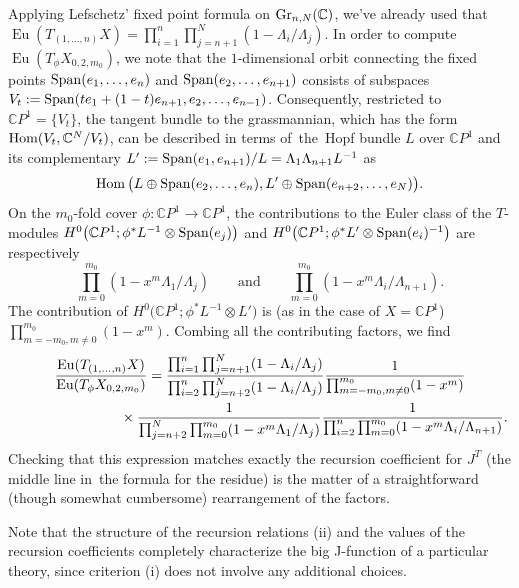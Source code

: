 \documentclass[10pt,a4paper]{amsart}
\numberwithin{equation}{section}
\def\CC{\mathbb C}
\def\Eu{\operatorname{Eu}}
\theoremstyle{definition}
\theoremstyle{plain}
\begin{document}
Applying Lefschetz' fixed point formula on ${\rm Gr}_{n,N}(\CC)$, we've already used that $\Eu(T_{(1,\dots,n)}X)\!=\prod_{i=1}^n\prod_{j=n+1}^N(1-\Lambda_i/\Lambda_j)$. In order to compute $\Eu(T_{\phi}X_{0,2,m_0})$, we note that the $1$-dimensional orbit connecting the fixed points $\mathop{\rm Span} (e_1,\dots,e_n)$ and $\mathop{\rm Span} (e_2,\dots,e_{n+1})$ consists of subspaces $V_t:=\mathop{\rm Span}(t e_1+(1-t) e_{n+1}, e_2,\dots,e_{n-1})$. Consequently, restricted to $\CC P^1=\{ V_t \}$, the tangent bundle to the grassmannian, which has the form $\mathop{\rm Hom} (V_t,\CC^N/V_t)$, can be described in terms of~the~Hopf bundle $L$ over $\CC P^1$ and its complementary $L':=\mathop{\rm Span}(e_1,e_{n+1})/L=\Lambda_1\Lambda_{n+1}L^{-1}$ as
\[
\mathop{\rm Hom} \big(L \oplus \mathop{\rm Span}(e_2,\dots,e_n), L' \oplus \mathop{\rm Span}(e_{n+2},\dots,e_N)\big).
\]
On the $m_0$-fold cover $\phi\colon \CC P^1\to \CC P^1$, the contributions to the Euler class of the $T$-modules $H^0\big(\CC P^1; \phi^*L^{-1}\otimes \mathop{\rm Span} (e_j)\big)$ and $H^0\big(\CC P^1; \phi^*L'\otimes \mathop{\rm Span}(e_i)^{-1}\big)$ are respectively
\[
\prod_{m=0}^{m_0}(1-x^m\Lambda_1/\Lambda_j)\qquad \text{and}\qquad \prod_{m=0}^{m_0}(1-x^m\Lambda_i/\Lambda_{n+1}).
\]
The contribution of $H^0\big(\CC P^1; \phi^*L^{-1}\otimes L'\big)$ is (as in the case of $X=\CC P^1$) $\prod_{m=-m_0, m\neq 0}^{m_0}(1-x^m)$. Combing all the contributing factors, we find
\begin{gather*}
\frac{\Eu(T_{(1,\dots,n)}X)}{\Eu(T_{\phi}X_{0,2,m_0})}=
\frac{\prod_{i=1}^n\prod_{j=n+1}^N(1-\Lambda_i/\Lambda_j)}
{\prod_{i=2}^n\prod_{j=n+2}^N(1-\Lambda_i/\Lambda_j)}
\frac{1}{\prod_{m=-m_0, m\neq 0}^{m_0}(1-x^m)}
\\ \hphantom{\frac{\Eu(T_{(1,\dots,n)}X)}{\Eu(T_{\phi}X_{0,2,m_0})}=}
{}\times \frac{1}{\prod_{j=n+2}^N\prod_{m=0}^{m_0}(1-x^m\Lambda_1/\Lambda_j)}
\frac{1}{\prod_{i=2}^n\prod_{m=0}^{m_0}(1-x^m\Lambda_i/\Lambda_{n+1})}.
\end{gather*}
Checking that this expression matches exactly the recursion coefficient for $J^T$ (the middle line in~the formula for the residue) is the matter of a straightforward (though somewhat cumbersome) rearrangement of the factors.

\begin{Remark}\label{rmk3}
Note that the structure of the recursion relations (ii) and the values of the recursion coefficients completely characterize the big J-function of a particular theory, since criterion (i) does not involve any additional choices.
\end{Remark}
\end{document}
